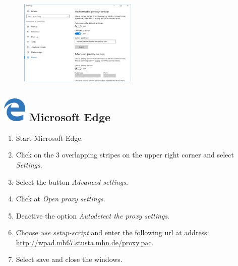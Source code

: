 \documentclass[a4paper,12pt]{scrartcl}
\begin{document}
\newpage
\begin{figure}
	\begin{center}
		\includegraphics[width=0.5\textwidth,keepaspectratio]{Bilder/Proxy_Edge_EN_mb}
	\end{center}
\end{figure}

\subsection*{\includegraphics[height=1.2cm,keepaspectratio]{Bilder/Mcrosoft_Edge_logo} Microsoft Edge}
\begin{enumerate}
	\item Start Microsoft Edge.
	\item Click on the 3 overlapping stripes on the upper right corner and select \emph{Settings}.
	\item Select the button \emph{Advanced settings}.
	\item Click at \emph{Open proxy settings}.
	\item Deactive the option \emph{Autodetect the proxy settings}.
	\item Choose \emph{use setup-script} and enter the following url at address: \\ \url{http://wpad.mb67.stusta.mhn.de/proxy.pac}.
	\item Select save and close the windows.
\end{enumerate}
\end{document}
